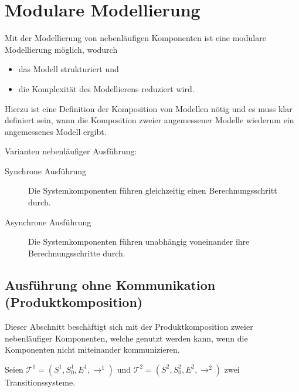 	\section{Modulare Modellierung}
		Mit der Modellierung von nebenläufigen Komponenten ist eine modulare Modellierung möglich, wodurch
		\begin{itemize}
			\item das Modell strukturiert und
			\item die Komplexität des Modellierens reduziert wird.
		\end{itemize}
		Hierzu ist eine Definition der Komposition von Modellen nötig und es muss klar definiert sein, wann die Komposition zweier angemessener Modelle wiederum ein angemessenes Modell ergibt.

		Varianten nebenläufiger Ausführung:
		\begin{description}
			\item[Synchrone Ausführung] Die Systemkomponenten führen gleichzeitig einen Berechnungsschritt durch.
			\item[Asynchrone Ausführung] Die Systemkomponenten führen unabhängig voneinander ihre Berechnungsschritte durch.
		\end{description}

		\subsection{Ausführung ohne Kommunikation (Produktkomposition)}
			Dieser Abschnitt beschäftigt sich mit der Produktkomposition zweier nebenläufiger Komponenten, welche genutzt werden kann, wenn die Komponenten nicht miteinander kommunizieren.

			Seien $ \mathcal{T} ^ 1 = (S ^ 1, S _ 0 ^ 1, E ^ 1, \rightarrow ^ 1) $ und $ \mathcal{T} ^ 2 = (S ^ 2, S _ 0 ^ 2, E ^ 2, \rightarrow ^ 2) $ zwei Transitionssysteme.

